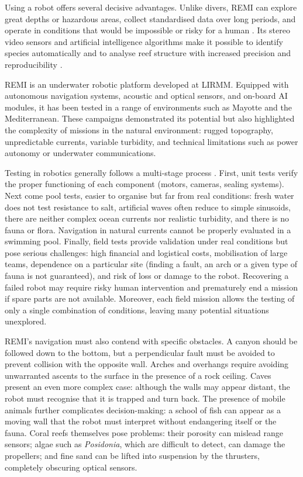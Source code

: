 Using a robot offers several decisive advantages. Unlike divers, REMI can explore great depths or hazardous areas, collect standardised data over long periods, and operate in conditions that would be impossible or risky for a human \cite{GonzalezGarcia2020}. Its stereo video sensors and artificial intelligence algorithms make it possible to identify species automatically and to analyse reef structure with increased precision and reproducibility \cite{Villon2020,Saleh2022}.

REMI is an underwater robotic platform developed at LIRMM. Equipped with autonomous navigation systems, acoustic and optical sensors, and on-board AI modules, it has been tested in a range of environments such as Mayotte and the Mediterranean. These campaigns demonstrated its potential but also highlighted the complexity of missions in the natural environment: rugged topography, unpredictable currents, variable turbidity, and technical limitations such as power autonomy or underwater communications.

Testing in robotics generally follows a multi-stage process \cite{GonzalezGarcia2020}. First, unit tests verify the proper functioning of each component (motors, cameras, sealing systems). Next come pool tests, easier to organise but far from real conditions: fresh water does not test resistance to salt, artificial waves often reduce to simple sinusoids, there are neither complex ocean currents nor realistic turbidity, and there is no fauna or flora. Navigation in natural currents cannot be properly evaluated in a swimming pool. Finally, field tests provide validation under real conditions but pose serious challenges: high financial and logistical costs, mobilisation of large teams, dependence on a particular site (finding a fault, an arch or a given type of fauna is not guaranteed), and risk of loss or damage to the robot. Recovering a failed robot may require risky human intervention and prematurely end a mission if spare parts are not available. Moreover, each field mission allows the testing of only a single combination of conditions, leaving many potential situations unexplored.

REMI's navigation must also contend with specific obstacles. A canyon should be followed down to the bottom, but a perpendicular fault must be avoided to prevent collision with the opposite wall. Arches and overhangs require avoiding unwarranted ascents to the surface in the presence of a rock ceiling. Caves present an even more complex case: although the walls may appear distant, the robot must recognise that it is trapped and turn back. The presence of mobile animals further complicates decision-making: a school of fish can appear as a moving wall that the robot must interpret without endangering itself or the fauna. Coral reefs themselves pose problems: their porosity can mislead range sensors; algae such as \emph{Posidonia}, which are difficult to detect, can damage the propellers; and fine sand can be lifted into suspension by the thrusters, completely obscuring optical sensors.

